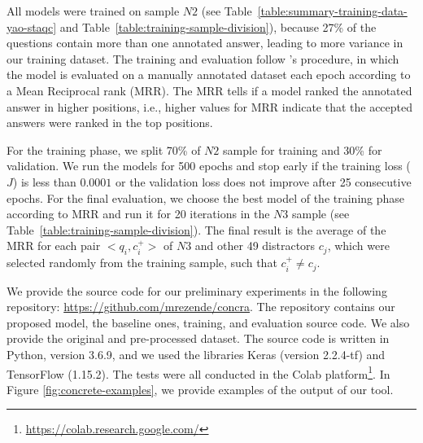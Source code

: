\documentclass[sigconf]{acmart}
\begin{document}
All models were trained on sample $N2$ (see Table~\ref{table:summary-training-data-yao-staqc} and Table~\ref{table:training-sample-division}), because 27\% of the questions contain more than one annotated answer, leading to more variance in our training dataset. The training and evaluation follow \citet{iyer-etal-2016-summarizing}'s procedure, in which the model is evaluated on a manually annotated dataset each epoch according to a Mean Reciprocal rank (MRR). The MRR tells if a model ranked the annotated answer in higher positions, i.e., higher values for MRR indicate that the accepted answers were ranked in the top positions.

For the training phase, we split 70\% of $N2$ sample for training and 30\% for validation. We run the models for 500 epochs and stop early if the training loss ($J$) is less than $0.0001$ or the validation loss does not improve after 25 consecutive epochs. For the final evaluation, we choose the best model of the training phase according to MRR and run it for 20 iterations in the $N3$ sample (see Table~\ref{table:training-sample-division}). The final result is the average of the MRR for each pair $<q_{i}, c_{i}^{+}>$ of $N3$ and other 49 distractors $c_{j}$, which were selected randomly from the training sample, such that $c_{i}^{+} \neq c_{j}$.

We provide the source code for our preliminary experiments in the following repository: \url{https://github.com/mrezende/concra}. The repository contains our proposed model, the baseline ones, training, and evaluation source code. We also provide the original and pre-processed dataset. The source code is written in Python, version 3.6.9, and we used the libraries Keras (version 2.2.4-tf) and TensorFlow (1.15.2). The tests were all conducted in the Colab platform\footnote{\url{https://colab.research.google.com/}}. In Figure \ref{fig:concrete-examples}, we provide examples of the output of our tool.
\end{document}
